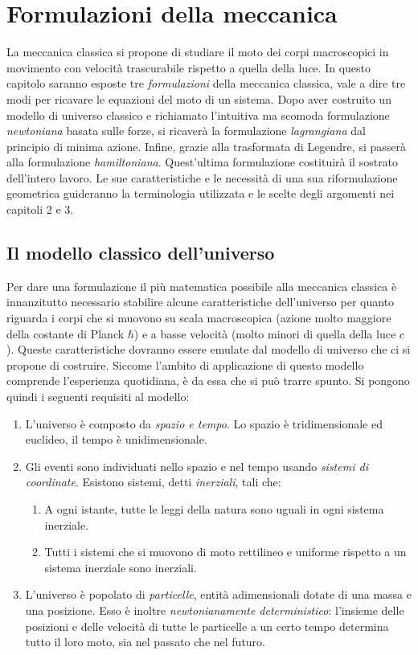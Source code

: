 \chapter{Formulazioni della meccanica}
La meccanica classica si propone di studiare il moto dei corpi macroscopici in movimento con velocità trascurabile rispetto a quella della luce. In questo capitolo saranno esposte tre \emph{formulazioni} della meccanica classica, vale a dire tre modi per ricavare le equazioni del moto di un sistema. Dopo aver costruito un modello di universo classico e richiamato l'intuitiva ma scomoda formulazione \emph{newtoniana} basata sulle forze, si ricaverà la formulazione \emph{lagrangiana} dal principio di minima azione. Infine, grazie alla trasformata di Legendre, si passerà alla formulazione \emph{hamiltoniana}. Quest'ultima formulazione costituirà il sostrato dell'intero lavoro. Le sue caratteristiche e le necessità di una sua riformulazione geometrica guideranno la terminologia utilizzata e le scelte degli argomenti nei capitoli 2 e 3. 

\section{Il modello classico dell'universo}
Per dare una formulazione il più matematica possibile alla meccanica classica è innanzitutto necessario stabilire alcune caratteristiche dell'universo per quanto riguarda i corpi che si muovono su scala macroscopica (azione molto maggiore della costante di Planck $\hbar$) e a basse velocità (molto minori di quella della luce $c$). Queste caratteristiche dovranno essere emulate dal modello di universo che ci si propone di costruire. Siccome l'ambito di applicazione di questo modello comprende l'esperienza quotidiana, è da essa che si può trarre spunto. Si pongono quindi i seguenti requisiti al modello:
\begin{enumerate}
  \item L'universo è composto da \emph{spazio e tempo}. Lo spazio è tridimensionale ed euclideo, il tempo è unidimensionale.
  \item  Gli eventi sono individuati nello spazio e nel tempo usando \emph{sistemi di coordinate}. Esistono sistemi, detti \emph{inerziali}, tali che:
  \begin{enumerate}
    \item A ogni istante, tutte le leggi della natura sono uguali in ogni sistema inerziale.
    \item Tutti i sistemi che si muovono di moto rettilineo e uniforme rispetto a un sistema inerziale sono inerziali.
  \end{enumerate}
  \item L'universo è popolato di \emph{particelle}, entità adimensionali dotate di una massa e una posizione. Esso è inoltre \emph{newtonianamente deterministico}: l'insieme delle posizioni e delle velocità di tutte le particelle a un certo tempo determina tutto il loro moto, sia nel passato che nel futuro.
\end{enumerate}

